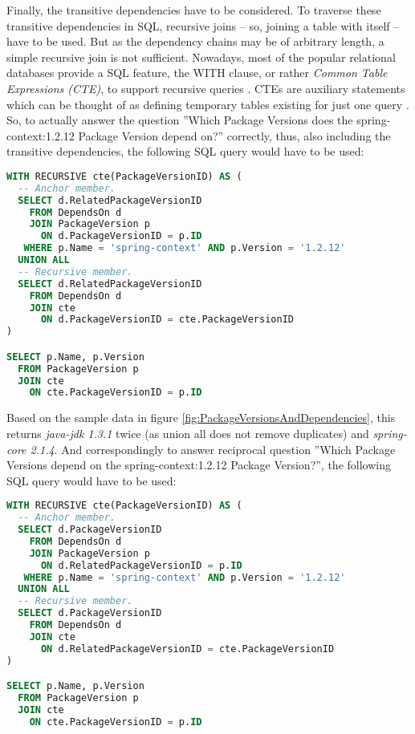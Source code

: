 Finally, the transitive dependencies have to be considered. To traverse these transitive dependencies in SQL, recursive joins -- so, joining a table with itself -- have to be used. But as the dependency chains may be of arbitrary length, a simple recursive join is not sufficient. Nowadays, most of the popular relational databases provide a SQL feature, the WITH clause, or rather \emph{Common Table Expressions (CTE)}, to support recursive queries \cite{mysqlCTE, postgresCTE, sqliteCTE}. CTEs are auxiliary statements which can be thought of as defining temporary tables existing for just one query \cite{postgresCTE}. So, to actually answer the question ''Which Package Versions does the spring-context:1.2.12 Package Version depend on?'' correctly, thus, also including the transitive dependencies, the following SQL query would have to be used:\\

\begin{lstlisting}[language=SQL, caption=SQL Query -- Package Version Dependencies (transitive), captionpos=b, label=lst:PackageVersionDependenciesIncTransitive]
WITH RECURSIVE cte(PackageVersionID) AS (
  -- Anchor member.
  SELECT d.RelatedPackageVersionID
    FROM DependsOn d
    JOIN PackageVersion p
      ON d.PackageVersionID = p.ID
   WHERE p.Name = 'spring-context' AND p.Version = '1.2.12'
  UNION ALL
  -- Recursive member.
  SELECT d.RelatedPackageVersionID
    FROM DependsOn d
    JOIN cte
      ON d.PackageVersionID = cte.PackageVersionID
)

SELECT p.Name, p.Version
  FROM PackageVersion p
  JOIN cte
    ON cte.PackageVersionID = p.ID
\end{lstlisting}

Based on the sample data in figure \ref{fig:PackageVersionsAndDependencies}, this returns \emph{java-jdk 1.3.1} twice (as union all does not remove duplicates) and \emph{spring-core 2.1.4}. And correspondingly to answer reciprocal question ''Which Package Versions depend on the spring-context:1.2.12 Package Version?'', the following SQL query would have to be used:\\

\begin{lstlisting}[language=SQL, caption=SQL Query -- Package Version Reciprocal Dependencies (transitive), captionpos=b, label=lst:PackageVersionReciprocalDependenciesIncTransitive]
WITH RECURSIVE cte(PackageVersionID) AS (
  -- Anchor member.
  SELECT d.PackageVersionID
    FROM DependsOn d
    JOIN PackageVersion p
      ON d.RelatedPackageVersionID = p.ID
   WHERE p.Name = 'spring-context' AND p.Version = '1.2.12'
  UNION ALL
  -- Recursive member.
  SELECT d.PackageVersionID
    FROM DependsOn d
    JOIN cte
      ON d.RelatedPackageVersionID = cte.PackageVersionID
)

SELECT p.Name, p.Version
  FROM PackageVersion p
  JOIN cte
    ON cte.PackageVersionID = p.ID
\end{lstlisting}

